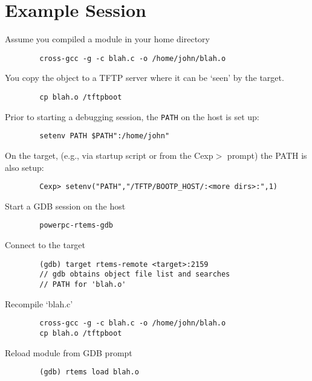 \documentclass{article}
\begin{document}
\section{Example Session}
	Assume you compiled a module in your home directory
\begin{verbatim}
		cross-gcc -g -c blah.c -o /home/john/blah.o
\end{verbatim}
    You copy the object to a TFTP server where it can be
	`seen' by the target.
\begin{verbatim}
		cp blah.o /tftpboot
\end{verbatim}
	Prior to starting a debugging session, the {\tt PATH} on the
	host is set up:
\begin{verbatim}
		setenv PATH $PATH":/home/john"
\end{verbatim}
	On the target, (e.g., via startup script or from the Cexp$>$
	prompt) the PATH is also setup:
\begin{verbatim}
		Cexp> setenv("PATH","/TFTP/BOOTP_HOST/:<more dirs>:",1)
\end{verbatim}
	Start a GDB session on the host
\begin{verbatim}
		powerpc-rtems-gdb
\end{verbatim}
	Connect to the target
\begin{verbatim}
		(gdb) target rtems-remote <target>:2159
		// gdb obtains object file list and searches
        // PATH for 'blah.o'
\end{verbatim}
	Recompile `blah.c'
\begin{verbatim}
		cross-gcc -g -c blah.c -o /home/john/blah.o
		cp blah.o /tftpboot
\end{verbatim}
	Reload module from GDB prompt
\begin{verbatim}
		(gdb) rtems load blah.o
\end{verbatim}
\end{document}
